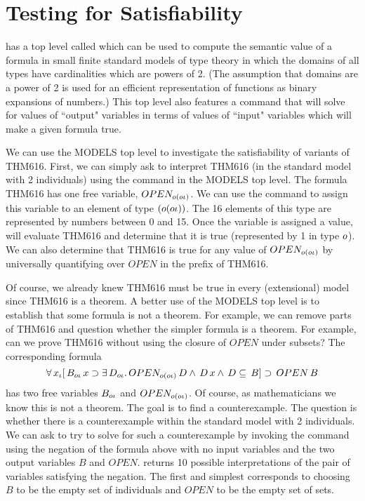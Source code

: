 \chapter{Testing for Satisfiability}\label{models}

{\TPS} has a top level called  which can be used to compute the
semantic value of a formula in small finite standard models of type
theory in which the domains of all types have cardinalities which are
powers of 2.  (The assumption that domains are a power of 2 is used
for an efficient representation of functions as binary expansions of numbers.)
This top level also features a  command that will solve
for values of  ``output" variables in terms of values of ``input"
variables which will make a given formula true.

We can use the MODELS top level to investigate the satisfiability
of variants of {THM616}.  First, we can simply
ask {\TPS} to interpret {THM616} (in the standard model
with 2 individuals)
using the  command in the  MODELS top level.
The formula {THM616} has one free variable, $OPEN_{o(o\iota)}$.
We can use the command  to assign this variable to
an element of type $(o(o\iota))$.  The 16 elements
of this type are represented by numbers between 0 and 15.
Once the variable is assigned a value,  will
evaluate {THM616} and determine that it is true (represented by 1 in type $o$).
We can also determine that {THM616} is true for any value of $OPEN_{o(o\iota)}$
by universally quantifying over $OPEN$ in the prefix of {THM616}.

Of course, we already knew {THM616} must be true in every (extensional)
model since {THM616} is a theorem.
A better use of the MODELS top level is to establish that some formula
is not a theorem.  For example, we can remove parts of {THM616}
and question whether the simpler formula is a theorem.
For example, can we prove {THM616} without using the closure
of $OPEN$ under subsets?  The corresponding formula 
$$\forall \,x_{\iota} [ \,B_{o\iota} \,x \supset \exists \,D_{o\iota} . \,OPEN_{o(o\iota)} \,D \land \,D \,x \land \,D \subseteq \,B] \supset \,OPEN \,B$$
has two free variables $B_{o\iota}$ and $OPEN_{o(o\iota)}$.
Of course, as mathematicians we know this is not a theorem.  The goal is
to find a counterexample.  The question is whether there is a counterexample
within the standard model with 2 individuals.  We can ask {\TPS} to try to
solve for such a counterexample by invoking the  command
using the negation of the formula above
with no input variables and the two output variables $B$ and $OPEN$.
{\TPS} returns 10 possible interpretations of the pair of variables 
satisfying the negation.  The first and simplest corresponds to
choosing $B$ to be the empty set of individuals and $OPEN$ to be the empty set of sets.

